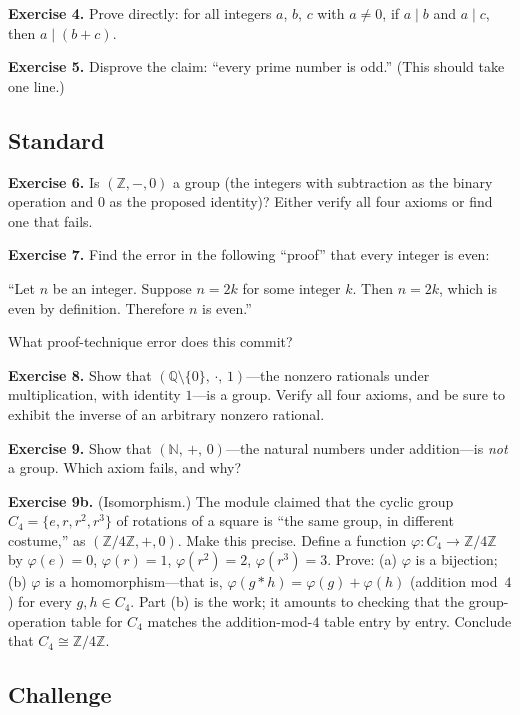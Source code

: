 \documentclass[11pt]{article}
\begin{document}
\bigskip
\textbf{Exercise 4.}\label{ex:m5:4} Prove directly: for all integers $a$, $b$, $c$ with $a \neq 0$, if $a \mid b$ and $a \mid c$, then $a \mid (b + c)$.

\bigskip
\textbf{Exercise 5.}\label{ex:m5:5} Disprove the claim: ``every prime number is odd.'' (This should take one line.)

\subsection*{Standard}

\textbf{Exercise 6.}\label{ex:m5:6} Is $(\mathbb{Z}, -, 0)$ a group (the integers with subtraction as the binary operation and $0$ as the proposed identity)? Either verify all four axioms or find one that fails.

\bigskip
\textbf{Exercise 7.}\label{ex:m5:7} Find the error in the following ``proof'' that every integer is even:

``Let $n$ be an integer. Suppose $n = 2k$ for some integer $k$. Then $n = 2k$, which is even by definition. Therefore $n$ is even.''

What proof-technique error does this commit?

\bigskip
\textbf{Exercise 8.}\label{ex:m5:8} Show that $(\mathbb{Q} \setminus \{0\},\, \cdot,\, 1)$---the nonzero rationals under multiplication, with identity $1$---is a group. Verify all four axioms, and be sure to exhibit the inverse of an arbitrary nonzero rational.

\bigskip
\textbf{Exercise 9.}\label{ex:m5:9} Show that $(\mathbb{N},\, +,\, 0)$---the natural numbers under addition---is \emph{not} a group. Which axiom fails, and why?

\bigskip
\textbf{Exercise 9b.}\label{ex:m5:9b} (Isomorphism.) The module claimed that the cyclic group $C_4 = \{e, r, r^2, r^3\}$ of rotations of a square is ``the same group, in different costume,'' as $(\mathbb{Z}/4\mathbb{Z}, +, 0)$. Make this precise. Define a function $\varphi : C_4 \to \mathbb{Z}/4\mathbb{Z}$ by $\varphi(e) = 0$, $\varphi(r) = 1$, $\varphi(r^2) = 2$, $\varphi(r^3) = 3$. Prove: (a) $\varphi$ is a bijection; (b) $\varphi$ is a homomorphism---that is, $\varphi(g * h) = \varphi(g) + \varphi(h)$ (addition mod~$4$) for every $g, h \in C_4$. Part (b) is the work; it amounts to checking that the group-operation table for $C_4$ matches the addition-mod-$4$ table entry by entry. Conclude that $C_4 \cong \mathbb{Z}/4\mathbb{Z}$.

\subsection*{Challenge}
\end{document}
